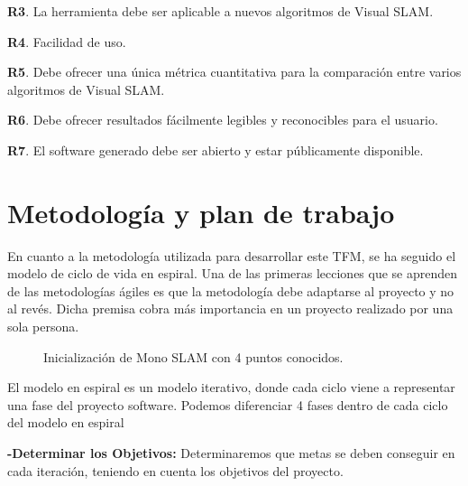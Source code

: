 	\textbf{R3}. La herramienta debe ser aplicable a nuevos algoritmos de Visual SLAM.

	\textbf{R4}. Facilidad de uso.

	\textbf{R5}. Debe ofrecer una única métrica cuantitativa para la comparación entre varios algoritmos de Visual SLAM.

	\textbf{R6}. Debe ofrecer resultados fácilmente legibles y reconocibles para el usuario.

	\textbf{R7}. El software generado debe ser abierto y estar públicamente disponible.

\section{Metodología y plan de trabajo}

En cuanto a la metodología utilizada para desarrollar este TFM, se ha seguido el modelo de ciclo de vida en espiral. Una de las primeras lecciones que se aprenden de las metodologías ágiles es que la metodología debe adaptarse al proyecto y no al revés. Dicha premisa cobra más importancia en un proyecto realizado por una sola persona.

\begin{figure}[H]
\begin{center}
\end{center}
\caption{Inicialización de Mono SLAM con 4 puntos conocidos.}
\end{figure}


El modelo en espiral es un modelo iterativo, donde cada ciclo viene a representar una fase del proyecto software. Podemos diferenciar 4 fases dentro de cada ciclo del modelo en espiral

\textbf{-Determinar los Objetivos:} Determinaremos que metas se deben conseguir en cada iteración, teniendo en cuenta los objetivos del proyecto.

